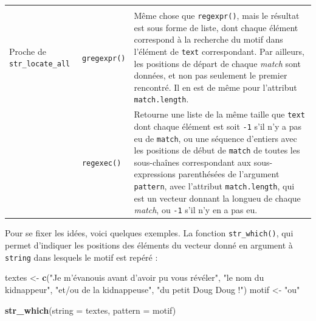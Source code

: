 \documentclass[
  11pt,
]{book}
\newenvironment{Shaded}{\begin{snugshade}}{\end{snugshade}}
\newcommand{\DataTypeTok}[1]{\textcolor[rgb]{0.13,0.29,0.53}{#1}}
\newcommand{\KeywordTok}[1]{\textcolor[rgb]{0.13,0.29,0.53}{\textbf{#1}}}
\newcommand{\NormalTok}[1]{#1}
\newcommand{\StringTok}[1]{\textcolor[rgb]{0.31,0.60,0.02}{#1}}
\numberwithin{equation}{section}
\numberwithin{countremarque}{section}
\begin{document}
\begin{longtable}[]{@{}lll@{}}
\begin{minipage}[t]{0.30\columnwidth}
\end{minipage}\tabularnewline
\begin{minipage}[t]{0.30\columnwidth}\raggedright
Proche de \texttt{str\_locate\_all}\strut
\end{minipage} & \begin{minipage}[t]{0.30\columnwidth}\raggedright
\texttt{gregexpr()}\strut
\end{minipage} & \begin{minipage}[t]{0.30\columnwidth}\raggedright
Même chose que \texttt{regexpr()}, mais le résultat est sous forme de liste, dont chaque élément correspond à la recherche du motif dans l'élément de \texttt{text} correspondant. Par ailleurs, les positions de départ de chaque \emph{match} sont données, et non pas seulement le premier rencontré. Il en est de même pour l'attribut \texttt{match.length}.\strut
\end{minipage}\tabularnewline
\begin{minipage}[t]{0.30\columnwidth}\raggedright
\strut
\end{minipage} & \begin{minipage}[t]{0.30\columnwidth}\raggedright
\texttt{regexec()}\strut
\end{minipage} & \begin{minipage}[t]{0.30\columnwidth}\raggedright
Retourne une liste de la même taille que \texttt{text} dont chaque élément est soit \texttt{-1} s'il n'y a pas eu de \texttt{match}, ou une séquence d'entiers avec les positions de début de \texttt{match} de toutes les sous-chaînes correspondant aux sous-expressions parenthésées de l'argument \texttt{pattern}, avec l'attribut \texttt{match.length}, qui est un vecteur donnant la longueu de chaque \emph{match}, ou \texttt{-1} s'il n'y en a pas eu.\strut
\end{minipage}\tabularnewline
\bottomrule
\end{longtable}

Pour se fixer les idées, voici quelques exemples. La fonction \texttt{str\_which()}, qui permet d'indiquer les positions des éléments du vecteur donné en argument à \texttt{string} dans lesquels le motif est repéré :

\begin{Shaded}
\begin{Highlighting}[]
\NormalTok{textes \textless{}{-}}\StringTok{ }\KeywordTok{c}\NormalTok{(}\StringTok{"Je m’évanouis avant d’avoir pu vous révéler"}\NormalTok{,}
          \StringTok{"le nom du kidnappeur"}\NormalTok{, }\StringTok{"et/ou de la kidnappeuse"}\NormalTok{,}
          \StringTok{"du petit Doug Doug !"}\NormalTok{)}
\NormalTok{motif \textless{}{-}}\StringTok{ "ou"}

\KeywordTok{str\_which}\NormalTok{(}\DataTypeTok{string =}\NormalTok{ textes, }\DataTypeTok{pattern =}\NormalTok{ motif)}
\end{Highlighting}
\end{Shaded}
\end{document}
